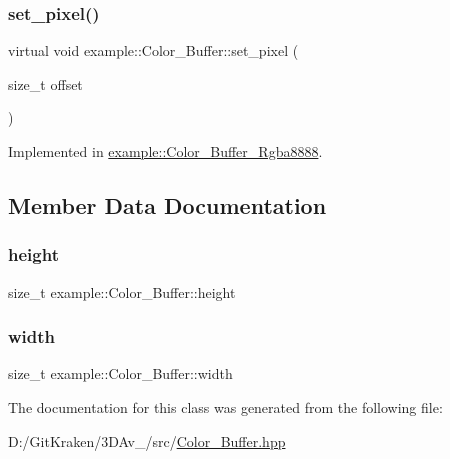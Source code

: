 \subsubsection{\texorpdfstring{set\+\_\+pixel()}{set\_pixel()}\hspace{0.1cm}{\footnotesize\ttfamily [2/2]}}
{\footnotesize\ttfamily virtual void example\+::\+Color\+\_\+\+Buffer\+::set\+\_\+pixel (\begin{DoxyParamCaption}\item[{size\+\_\+t}]{offset }\end{DoxyParamCaption})\hspace{0.3cm}{\ttfamily [pure virtual]}}



Implemented in \mbox{\hyperlink{classexample_1_1_color___buffer___rgba8888_ac741fa7bca9b980a475e6f7033b64347}{example\+::\+Color\+\_\+\+Buffer\+\_\+\+Rgba8888}}.



\subsection{Member Data Documentation}
\mbox{\label{classexample_1_1_color___buffer_ae01f4538ee30af1d3072a425c5ad37ac}} 
\subsubsection{\texorpdfstring{height}{height}}
{\footnotesize\ttfamily size\+\_\+t example\+::\+Color\+\_\+\+Buffer\+::height\hspace{0.3cm}{\ttfamily [protected]}}

\mbox{\label{classexample_1_1_color___buffer_ab61454d4b35cbba00d2e634d14ed20ac}} 
\subsubsection{\texorpdfstring{width}{width}}
{\footnotesize\ttfamily size\+\_\+t example\+::\+Color\+\_\+\+Buffer\+::width\hspace{0.3cm}{\ttfamily [protected]}}



The documentation for this class was generated from the following file\+:\begin{DoxyCompactItemize}
\item 
D\+:/\+Git\+Kraken/3\+D\+Av\+\_/src/\mbox{\hyperlink{_color___buffer_8hpp}{Color\+\_\+\+Buffer.\+hpp}}\end{DoxyCompactItemize}
